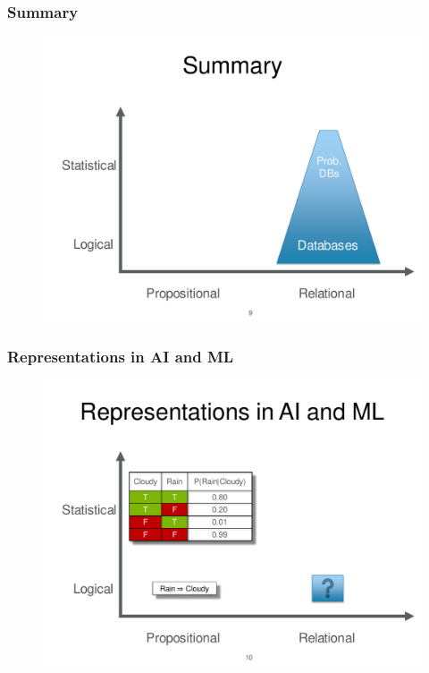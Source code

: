 \documentclass{beamer}
\begin{document}
\begin{frame}
\frametitle{Summary}

\begin{figure}[h]
\centering\includegraphics[width=0.95\linewidth]{prob-dbs.pdf}
\end{figure}
\end{frame}

\begin{frame}
\frametitle{Representations in AI and ML}
\begin{figure}[h]
\centering\includegraphics[width=0.95\linewidth]{ai-ml.pdf}
\end{figure}
\end{frame}
\end{document}
